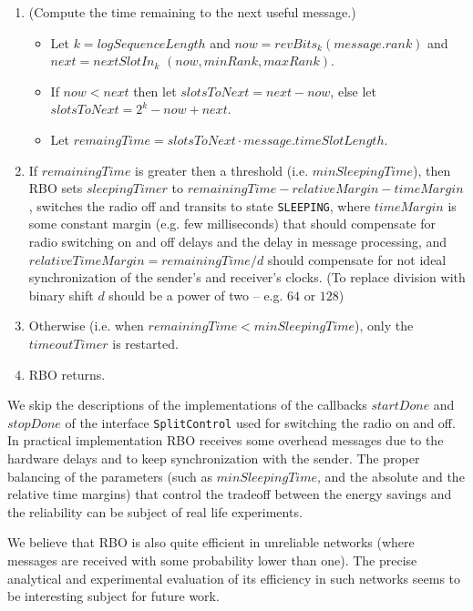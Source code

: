 \documentclass{llncs}
\begin{document}
\begin{enumerate}
\item
  (Compute the time remaining to the next useful message.)
  \begin{itemize}
    \item
      Let $k=logSequenceLength$ and $now=revBits_{k}(message.rank)$ 
      and $next= nextSlotIn_{k}$ $( now, minRank, maxRank)$.
    \item
      If $now<next$ then let $slotsToNext=next-now$, else let $slotsToNext=2^{k}-now+next$.
    \item
      Let $remaingTime=slotsToNext\cdot message.timeSlotLength$.
  \end{itemize}
\item
  If $remainingTime$ is greater then a threshold (i.e. $minSleepingTime$),
  then RBO sets $sleepingTimer$ to $remainingTime-relativeMargin-timeMargin$,
  switches the radio off and transits to state \verb|SLEEPING|,
  where $timeMargin$ is some constant margin (e.g. few milliseconds) 
  that should compensate for radio switching on and off delays and the delay in
  message processing, and $relativeTimeMargin=remainingTime/d$ 
  should compensate for not ideal synchronization of the sender's and receiver's
  clocks. 
  (To replace division with binary shift $d$ should be a power of two -- e.g. $64$ or $128$)

\item
Otherwise  (i.e. when $remainingTime < minSleepingTime$), 
only the $timeoutTimer$ is restarted.

\item
RBO returns.

\end{enumerate}
We skip the descriptions of the implementations of the callbacks $startDone$
and $stopDone$ of the interface \verb|SplitControl| used for switching the radio on and off.
In practical implementation RBO receives some overhead messages
due to the hardware delays and to keep synchronization with the sender.
The proper balancing of the parameters 
(such as $minSleepingTime$, and the absolute and the relative time margins)
that control the tradeoff between
the energy savings and the reliability can be subject of real life experiments.

We believe that RBO is also quite efficient in unreliable networks
(where messages are received with some probability lower than one).
The precise analytical and experimental evaluation of
its efficiency in such networks seems to be interesting subject
for future work.



 






\newpage


\end{document}
